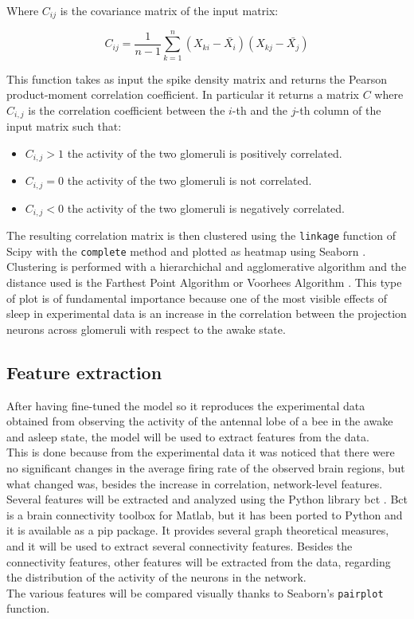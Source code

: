   Where $C_{ij}$ is the covariance matrix of the input matrix:

  \begin{equation}
    C_{ij} = \frac{1}{n-1}\sum_{k=1}^{n}(X_{ki} - \bar{X_i})(X_{kj} - \bar{X_j})
  \end{equation}

  This function takes as input the spike density matrix and returns the Pearson product-moment correlation coefficient.
  In particular it returns a matrix $C$ where $C_{i,j}$ is the correlation coefficient between the $i$-th and the $j$-th column of the input matrix such that:

  \begin{itemize}
    \item $C_{i,j} > 1$ the activity of the two glomeruli is positively correlated.
    \item $C_{i,j} = 0$ the activity of the two glomeruli is not correlated.
    \item $C_{i,j} < 0$ the activity of the two glomeruli is negatively correlated.
  \end{itemize}

  The resulting correlation matrix is then clustered using the \texttt{linkage} function of Scipy \cite{scipy} with the \texttt{complete} method and plotted as heatmap using Seaborn \cite{seaborn}.
  Clustering is performed with a hierarchichal and agglomerative algorithm and the distance used is the Farthest Point Algorithm or Voorhees Algorithm \cite{fpa}.
  This type of plot is of fundamental importance because one of the most visible effects of sleep in experimental data is an increase in the correlation between the projection neurons across glomeruli with respect to the awake state.

  \subsection{Feature extraction}
  \label{sec:feature-extraction}
  After having fine-tuned the model so it reproduces the experimental data obtained from observing the activity of the antennal lobe of a bee in the awake and asleep state, the model will be used to extract features from the data.\\
  This is done because from the experimental data it was noticed that there were no significant changes in the average firing rate of the observed brain regions, but what changed was, besides the increase in correlation, network-level features.\\
  Several features will be extracted and analyzed using the Python library bct \cite{bct}.
  Bct is a brain connectivity toolbox for Matlab, but it has been ported to Python and it is available as a pip package.
  It provides several graph theoretical measures, and it will be used to extract several connectivity features.
  Besides the connectivity features, other features will be extracted from the data, regarding the distribution of the activity of the neurons in the network.\\
  The various features will be compared visually thanks to Seaborn's \cite{seaborn} \texttt{pairplot} function.

